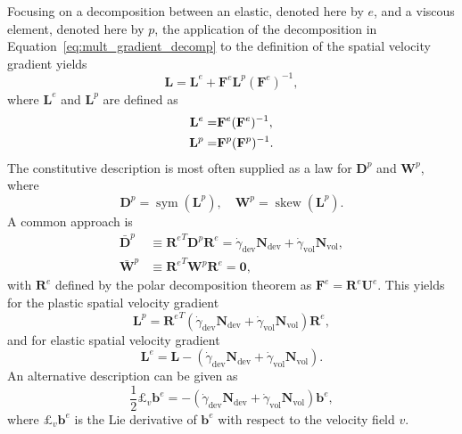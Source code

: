Focusing on a decomposition between an elastic, denoted here by $e$, and a viscous element, denoted here by $p$, the application of the decomposition in Equation~\eqref{eq:mult_gradient_decomp} to the definition of the spatial velocity gradient yields
\begin{equation}
	\mathbf L = \mathbf L^e + \mathbf F^e \mathbf L^p (\mathbf F^e)^{-1},
\end{equation}
where $\mathbf L^e$ and $\mathbf L^p$ are defined as
\begin{align}
	\mathbf L^e =&  \do{\mathbf F}^e(\mathbf F^e)^{-1},\\
	\mathbf L^p =&  \do{\mathbf F}^p(\mathbf F^p)^{-1}.
\end{align}
The constitutive description is most often supplied as a law for $\mathbf D^p$ and $\mathbf W^p$, where
\begin{equation}
	\mathbf D^p = \operatorname{sym}(\mathbf L^p),\quad \mathbf W^p = \operatorname{skew}(\mathbf L^p).
\end{equation}
A common approach is \citep{desouzanetoComputationalMethodsPlasticity2008}
\begin{align}
	\bar{\mathbf D}^p &\equiv  {\mathbf R^e}^T \mathbf D^p \mathbf R^e  = \dot\gamma_\text{dev} \mathbf N_\text{dev} + \dot\gamma_\text{vol} \mathbf N_\text{vol},\\
	\bar{\mathbf W}^p &\equiv {\mathbf R^e}^T \mathbf W^p \mathbf R^e = \bm 0,
\end{align}
with $\mathbf R^e$ defined by the polar decomposition theorem as $\mathbf F^e = \mathbf R^e\mathbf U^e$.
This yields for the plastic spatial velocity gradient
\begin{equation}
	\mathbf L^p = {\mathbf R^e}^T(\dot\gamma_\text{dev} \mathbf N_\text{dev} + \dot\gamma_\text{vol} \mathbf N_\text{vol})\mathbf R^e,
\end{equation}
and for elastic spatial velocity gradient
\begin{equation}
	\mathbf L^e = \mathbf L - (\dot\gamma_\text{dev} \mathbf N_\text{dev} + \dot\gamma_\text{vol} \mathbf N_\text{vol}).
\end{equation}
An alternative description can be given as
\begin{equation}
	\frac{1}{2}£_v \mathbf b^e = -(\dot\gamma_\text{dev} \mathbf N_\text{dev} + \dot\gamma_\text{vol} \mathbf N_\text{vol})\mathbf b^e,
\end{equation}
where $£_v \mathbf b^e$ is the Lie derivative of $\mathbf b^e$ with respect to the velocity field $v$.

